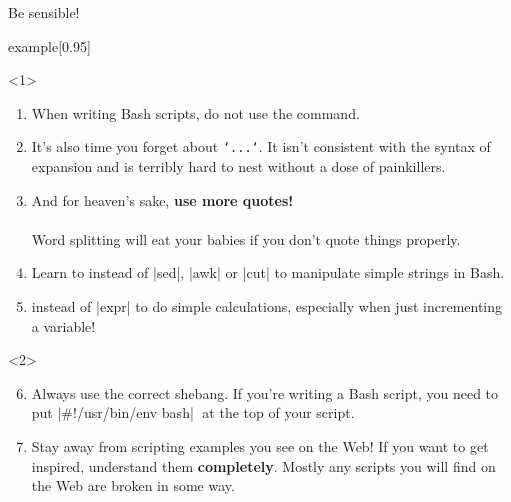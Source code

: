 \begin{frame}{Be sensible!}
    \vspace{-2mm}
    \begin{varblock}{example}[0.95\textwidth]{}
        \large {}
    \end{varblock}
    \medskip
    \parbox[c][0.7\textheight][t]{\textwidth}{
        \begin{onlyenv}<1>
            \begin{enumerate}
                \item When writing Bash scripts, \alert{do not use the \bash{[} command.}\\
                       \bash{[[}
                \item It's also time \alert{you forget about \texttt{`...`}}.
                      It isn't consistent with the syntax of expansion and is terribly hard to nest without a dose of painkillers.
                \item And for heaven's sake, \textbf{use more quotes!}\\
                      \\
                      Word splitting will eat your babies if you don't quote things properly.
                \item Learn to  instead of \bash|sed|, \bash|awk| or \bash|cut| to manipulate simple strings in Bash.
                \item {} instead of \bash|expr| to do simple calculations, especially when just incrementing a variable!
            \end{enumerate}
        \end{onlyenv}
        \begin{onlyenv}<2>
            \begin{enumerate}
                \setcounter{enumi}{5}
                \item Always use the correct shebang. If you're writing a Bash script, you need to put \bash|\#!/usr/bin/env bash|$\;$ at the top of your script.
                \item Stay away from scripting examples you see on the Web!
                      If you want to get inspired, understand them \textbf{completely}.
                      Mostly any scripts you will find on the Web are broken in some way.

\end{enumerate}
\end{onlyenv}}
\end{frame}
